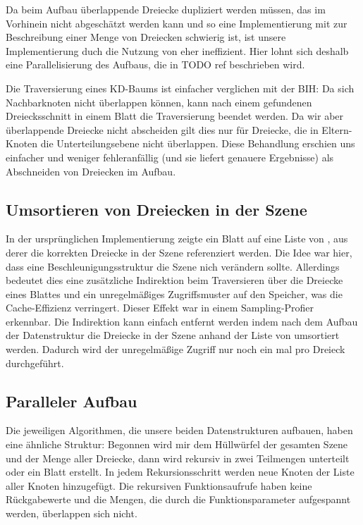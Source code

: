 Da beim Aufbau überlappende Dreiecke dupliziert werden müssen, das im Vorhinein nicht abgeschätzt werden kann und so eine Implementierung mit  zur Beschreibung einer Menge von Dreiecken schwierig ist, ist unsere Implementierung duch die Nutzung von  eher ineffizient. Hier lohnt sich deshalb eine Parallelisierung des Aufbaus, die in TODO ref beschrieben wird.

Die Traversierung eines KD-Baums ist einfacher verglichen mit der BIH: Da sich Nachbarknoten nicht überlappen können, kann nach einem gefundenen Dreiecksschnitt in einem Blatt die Traversierung beendet werden. Da wir aber überlappende Dreiecke nicht abscheiden gilt dies nur für Dreiecke, die in Eltern-Knoten die Unterteilungsebene nicht überlappen. Diese Behandlung erschien uns einfacher und weniger fehleranfällig (und sie liefert genauere Ergebnisse) als Abschneiden von Dreiecken im Aufbau.

\subsection{Umsortieren von Dreiecken in der Szene}

In der ursprünglichen Implementierung zeigte ein Blatt auf eine Liste von , aus derer die korrekten Dreiecke in der Szene referenziert werden. Die Idee war hier, dass eine Beschleunigungsstruktur die Szene nich verändern sollte. Allerdings bedeutet dies eine zusätzliche Indirektion beim Traversieren über die Dreiecke eines Blattes und ein unregelmäßiges Zugriffsmuster auf den Speicher, was die Cache-Effizienz verringert. Dieser Effekt war in einem Sampling-Profier erkennbar. Die Indirektion kann einfach entfernt werden indem nach dem Aufbau der Datenstruktur die Dreiecke in der Szene anhand der Liste von  umsortiert werden. Dadurch wird der unregelmäßige Zugriff nur noch ein mal pro Dreieck durchgeführt.

\subsection{Paralleler Aufbau}

Die jeweiligen Algorithmen, die unsere beiden Datenstrukturen aufbauen, haben eine ähnliche Struktur: Begonnen wird mir dem Hüllwürfel der gesamten Szene und der Menge aller Dreiecke, dann wird rekursiv in zwei Teilmengen unterteilt oder ein Blatt erstellt. In jedem Rekursionsschritt werden neue Knoten der Liste aller Knoten hinzugefügt. Die rekursiven Funktionsaufrufe haben keine Rückgabewerte und die Mengen, die durch die Funktionsparameter aufgespannt werden, überlappen sich nicht.

